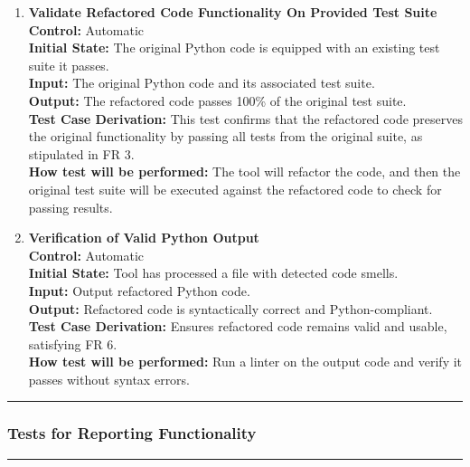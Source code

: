 \documentclass[12pt, titlepage]{article}
\newcommand{\colorrule}{\textcolor{BlueViolet}{\rule{\linewidth}{2pt}}}
\begin{document}
\begin{enumerate}[label={\bf \textcolor{Maroon}{test-FR-OV-\arabic*}}, wide=0pt, font=\itshape]
  \label{itm:FR-OV-1}
  \item \textbf{Validate Refactored Code Functionality On Provided Test Suite}\\[2mm]
    \textbf{Control:} Automatic \\
    \textbf{Initial State:} The original Python code is equipped with an existing test suite it passes.\\
    \textbf{Input:} The original Python code and its associated test suite.\\
    \textbf{Output:} The refactored code passes 100\% of the original test suite.\\[2mm]
    \textbf{Test Case Derivation:} This test confirms that the refactored code preserves the original functionality by passing all tests from the original suite, as stipulated in FR 3.\\[2mm]
    \textbf{How test will be performed:} The tool will refactor the code, and then the original test suite will be executed against the refactored code to check for passing results.
  
  \label{itm:FR-OV-2}
  \item \textbf{Verification of Valid Python Output}\\[2mm]
    \textbf{Control:} Automatic \\
    \textbf{Initial State:} Tool has processed a file with detected code smells.\\
    \textbf{Input:} Output refactored Python code.\\
    \textbf{Output:} Refactored code is syntactically correct and Python-compliant.\\[2mm]
    \textbf{Test Case Derivation:} Ensures refactored code remains valid and usable, satisfying FR 6.\\[2mm]
    \textbf{How test will be performed:} Run a linter on the output code and verify it passes without syntax errors.
  
\end{enumerate}

\newpage

\noindent
\colorrule

\subsubsection{Tests for Reporting Functionality}
\colorrule
\end{document}
